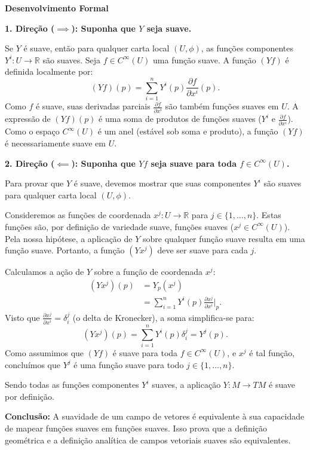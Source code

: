 {	\textbf{Desenvolvimento Formal}
	
	\textbf{1. Direção ($\implies$): Suponha que $Y$ seja suave.}
	
	Se $Y$ é suave, então para qualquer carta local $(U, \phi)$, as funções componentes $Y^i : U \to \mathbb{R}$ são suaves. Seja $f \in C^\infty(U)$ uma função suave. A função $(Yf)$ é definida localmente por:
	\begin{equation*}
		(Yf)(p) = \sum_{i=1}^n Y^i(p) \frac{\partial f}{\partial x^i}(p).
	\end{equation*}
	Como $f$ é suave, suas derivadas parciais $\frac{\partial f}{\partial x^i}$ são também funções suaves em $U$. A expressão de $(Yf)(p)$ é uma soma de produtos de funções suaves ($Y^i$ e $\frac{\partial f}{\partial x^i}$). Como o espaço $C^\infty(U)$ é um anel (estável sob soma e produto), a função $(Yf)$ é necessariamente suave em $U$.
	
	\textbf{2. Direção ($\impliedby$): Suponha que $Yf$ seja suave para toda $f \in C^\infty(U)$.}
	
	Para provar que $Y$ é suave, devemos mostrar que suas componentes $Y^i$ são suaves para qualquer carta local $(U, \phi)$. 
	
	Consideremos as funções de coordenada $x^j : U \to \mathbb{R}$ para $j \in \{1, \dots, n\}$. Estas funções são, por definição de variedade suave, funções suaves ($x^j \in C^\infty(U)$). Pela nossa hipótese, a aplicação de $Y$ sobre qualquer função suave resulta em uma função suave. Portanto, a função $(Y x^j)$ deve ser suave para cada $j$.
	
	Calculamos a ação de $Y$ sobre a função de coordenada $x^j$:
	\begin{align*}
		(Y x^j)(p) &= Y_p(x^j) \\
		&= \sum_{i=1}^n Y^i(p) \frac{\partial x^j}{\partial x^i} \Big|_p.
	\end{align*}
	Visto que $\frac{\partial x^j}{\partial x^i} = \delta^j_i$ (o delta de Kronecker), a soma simplifica-se para:
	\begin{equation*}
		(Y x^j)(p) = \sum_{i=1}^n Y^i(p) \delta^j_i = Y^j(p).
	\end{equation*}
	Como assumimos que $(Y f)$ é suave para toda $f \in C^\infty(U)$, e $x^j$ é tal função, concluímos que $Y^j$ é uma função suave para todo $j \in \{1, \dots, n\}$.
	
	Sendo todas as funções componentes $Y^i$ suaves, a aplicação $Y : M \to TM$ é suave por definição.
	
	\textbf{Conclusão:}
	A suavidade de um campo de vetores é equivalente à sua capacidade de mapear funções suaves em funções suaves. Isso prova que a definição geométrica e a definição analítica de campos vetoriais suaves são equivalentes.
}
